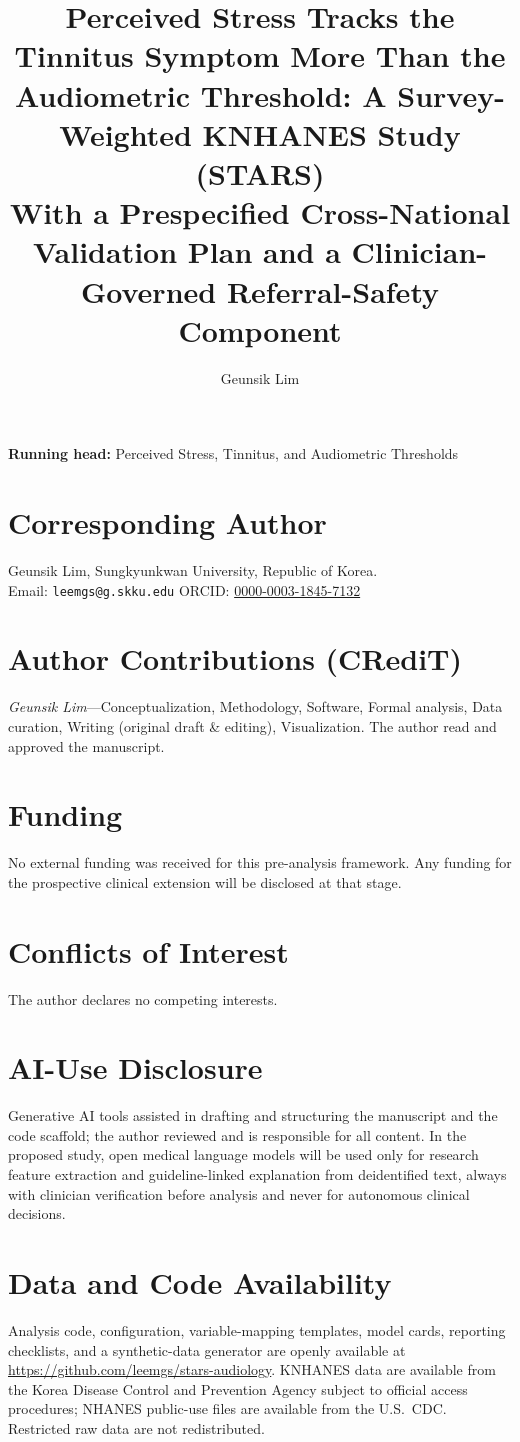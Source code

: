 \documentclass[12pt]{article}
\title{Perceived Stress Tracks the Tinnitus Symptom More Than the Audiometric Threshold: A Survey-Weighted KNHANES Study (STARS)\\[2pt]\large With a Prespecified Cross-National Validation Plan and a Clinician-Governed Referral-Safety Component}
\author[1]{Geunsik Lim}
\affil[1]{Sungkyunkwan University, Republic of Korea}
\date{}
\begin{document}
\maketitle
\thispagestyle{empty}

\vspace{1em}
\noindent\textbf{Running head:} Perceived Stress, Tinnitus, and Audiometric Thresholds

\section*{Corresponding Author}
Geunsik Lim, Sungkyunkwan University, Republic of Korea.\\
Email: \texttt{leemgs@g.skku.edu} \quad ORCID: \href{https://orcid.org/0000-0003-1845-7132}{0000-0003-1845-7132}

\section*{Author Contributions (CRediT)}
\emph{Geunsik Lim}---Conceptualization, Methodology, Software, Formal analysis, Data curation, Writing (original draft \& editing), Visualization. The author read and approved the manuscript.

\section*{Funding}
No external funding was received for this pre-analysis framework. Any funding for the prospective clinical extension will be disclosed at that stage.

\section*{Conflicts of Interest}
The author declares no competing interests.

\section*{AI-Use Disclosure}
Generative AI tools assisted in drafting and structuring the manuscript and the code scaffold; the author reviewed and is responsible for all content. In the proposed study, open medical language models will be used only for research feature extraction and guideline-linked explanation from deidentified text, always with clinician verification before analysis and never for autonomous clinical decisions.

\section*{Data and Code Availability}
Analysis code, configuration, variable-mapping templates, model cards, reporting checklists, and a synthetic-data generator are openly available at \url{https://github.com/leemgs/stars-audiology}. KNHANES data are available from the Korea Disease Control and Prevention Agency subject to official access procedures; NHANES public-use files are available from the U.S.\ CDC. Restricted raw data are not redistributed.
\end{document}
